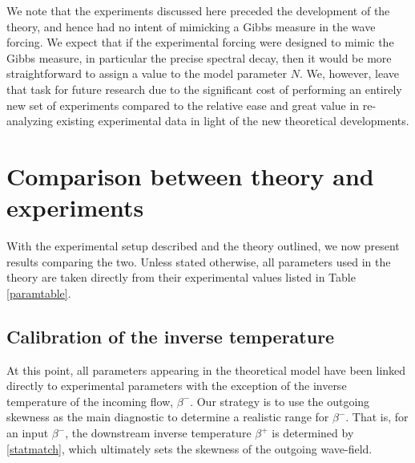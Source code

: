 \documentclass[11pt]{article}
\newcommand{\eps}{\varepsilon}
\newcommand{\lamfac}{N}
\newcommand{\drat}{\mathcal{D}}
\newcommand{\dratdn}{\drat_+}
\newcommand{\epsup}{\eps_0}
\newcommand{\delup}{\delta_0}
\newcommand{\invtemp}{\beta}
\newcommand{\itup}{\invtemp^{-}}
\newcommand{\itdn}{\invtemp^{+}}
\begin{document}
	We note that the experiments discussed here preceded the development of the theory, and hence had no intent of mimicking a Gibbs measure in the wave forcing. We expect that if the experimental forcing were designed to mimic the Gibbs measure, in particular the precise spectral decay, then it would be more straightforward to assign a value to the model parameter $\lamfac$. We, however, leave that task for future research due to the significant cost of performing an entirely new set of experiments compared to the relative ease and great value in re-analyzing existing experimental data in light of the new theoretical developments.

	

\section{Comparison between theory and experiments}
\label{results}

With the experimental setup described and the theory outlined, we now present results comparing the two. Unless stated otherwise, all parameters used in the theory are taken directly from their experimental values listed in Table \ref{paramtable}. 

\subsection{Calibration of the inverse temperature}

At this point, all parameters appearing in the theoretical model have been linked directly to experimental parameters with the exception of the inverse temperature of the incoming flow, $\itup$.
Our strategy is to use the outgoing skewness as the main diagnostic to determine a realistic range for $\itup$. That is, for an input $\itup$, the downstream inverse temperature $\itdn$ is determined by \eqref{statmatch}, which ultimately sets the skewness of the outgoing wave-field.
\end{document}
